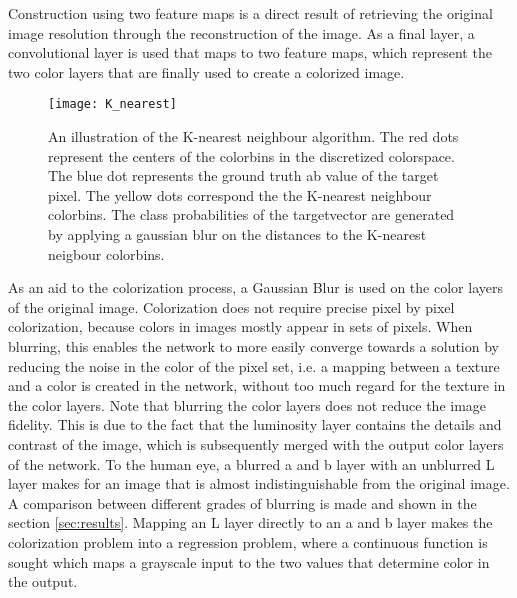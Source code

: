 Construction using two feature maps is a direct result of retrieving the original image resolution through the reconstruction of the image. As a final layer, a convolutional layer is used that maps to two feature maps, which represent the two color layers that are finally used to create a colorized image.

\begin{wrapfigure}{R}{0.5\textwidth}
	\vspace{-20pt}
	\begin{center}
		\texttt{[image: K\_nearest]}
	\end{center}
	\caption{An illustration of the K-nearest neighbour algorithm. The red dots represent the centers of the colorbins in the discretized colorspace. The blue dot represents the ground truth ab value of the target pixel. The yellow dots correspond the the K-nearest neighbour colorbins. The class probabilities of the targetvector are generated by applying a gaussian blur on the distances to the K-nearest neigbour colorbins.}
	\vspace{0pt}
	\label{fig:k_nearest}
\end{wrapfigure}

As an aid to the colorization process, a Gaussian Blur is used on the color layers of the original image. Colorization does not require precise pixel by pixel colorization, because colors in images mostly appear in sets of pixels. When blurring, this enables the network to more easily converge towards a solution by reducing the noise in the color of the pixel set, i.e. a mapping between a texture and a color is created in the network, without too much regard for the texture in the color layers. Note that blurring the color layers does not reduce the image fidelity. This is due to the fact that the luminosity layer contains the details and contrast of the image, which is subsequently merged with the output color layers of the network. To the human eye, a blurred a and b layer with an unblurred L layer makes for an image that is almost indistinguishable from the original image. A comparison between different grades of blurring is made and shown in the section \ref{sec:results}. Mapping an L layer directly to an a and b layer makes the colorization problem into a regression problem, where a continuous function is sought which maps a grayscale input to the two values that determine color in the output.

